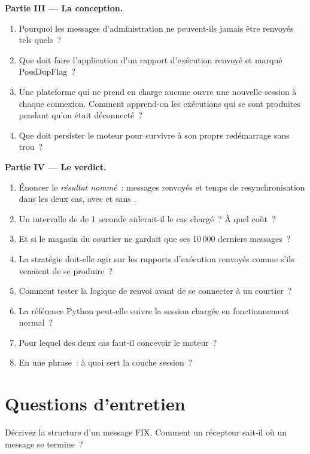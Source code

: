 \begin{problem}
\medskip\noindent\textbf{Partie III --- La conception.}
\begin{enumerate}[resume]
\item Pourquoi les messages d'administration ne peuvent-ils jamais être renvoyés tels quels~?
\item Que doit faire l'application d'un rapport d'exécution renvoyé et marqué PossDupFlag~?
\item Une plateforme qui ne prend en charge aucune  ouvre une nouvelle session à chaque connexion. Comment apprend-on les exécutions qui
se sont produites pendant qu'on était déconnecté~?
\item Que doit persister le moteur pour survivre à son propre redémarrage sans trou~?
\end{enumerate}

\medskip\noindent\textbf{Partie IV --- Le verdict.}
\begin{enumerate}[resume]
\item Énoncer le \emph{résultat nommé}~: messages renvoyés et temps de resynchronisation dans les deux cas, avec et sans .
\item Un intervalle de  de 1 seconde aiderait-il le cas chargé~? À quel coût~?
\item Et si le magasin du courtier ne gardait que ses 10\,000 derniers messages~?
\item La stratégie doit-elle agir sur les rapports d'exécution renvoyés comme s'ils venaient de se produire~?
\item Comment tester la logique de renvoi avant de se connecter à un courtier~?
\item La référence Python peut-elle suivre la session chargée en fonctionnement normal~?
\item Pour lequel des deux cas faut-il concevoir le moteur~?
\item En une phrase~: à quoi sert la couche session~?
\end{enumerate}
\end{problem}

\section{Questions d'entretien}

\begin{interviewq}\label{iq:ll:protocols-i-fix:1}
Décrivez la structure d'un message FIX. Comment un récepteur sait-il où un message se termine~?
\end{interviewq}

